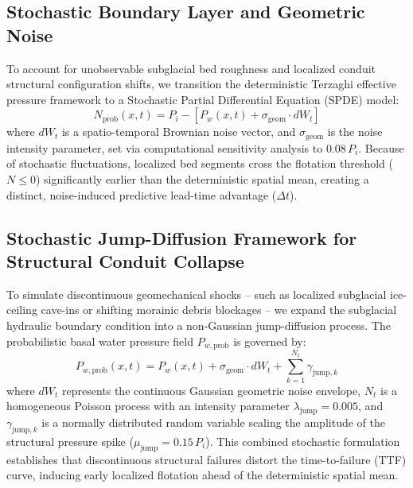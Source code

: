 \documentclass[11pt,twocolumn]{article}
\begin{document}
\subsection{Stochastic Boundary Layer and Geometric Noise}
To account for unobservable subglacial bed roughness and localized conduit structural configuration shifts, we transition the deterministic Terzaghi effective pressure framework to a Stochastic Partial Differential Equation (SPDE) model:
\begin{equation}
N_{\text{prob}}(x, t) = P_i - \left[ P_w(x, t) + \sigma_{\text{geom}} \cdot dW_t \right]
\end{equation}
where $dW_t$ is a spatio-temporal Brownian noise vector, and $\sigma_{\text{geom}}$ is the noise intensity parameter, set via computational sensitivity analysis to $0.08 \, P_i$. Because of stochastic fluctuations, localized bed segments cross the flotation threshold ($N \le 0$) significantly earlier than the deterministic spatial mean, creating a distinct, noise-induced predictive lead-time advantage ($\Delta t$).
\subsection{Stochastic Jump-Diffusion Framework for Structural Conduit Collapse}
To simulate discontinuous geomechanical shocks -- such as localized subglacial ice-ceiling cave-ins or shifting morainic debris blockages -- we expand the subglacial hydraulic boundary condition into a non-Gaussian jump-diffusion process. The probabilistic basal water pressure field $P_{w,\text{prob}}$ is governed by:
\begin{equation}
P_{w,\text{prob}}(x, t) = P_w(x, t) + \sigma_{\text{geom}} \cdot dW_t + \sum_{k=1}^{N_t} \gamma_{\text{jump}, k}
\end{equation}
where $dW_t$ represents the continuous Gaussian geometric noise envelope, $N_t$ is a homogeneous Poisson process with an intensity parameter $\lambda_{\text{jump}} = 0.005$, and $\gamma_{\text{jump}, k}$ is a normally distributed random variable scaling the amplitude of the structural pressure spike ($\mu_{\text{jump}} = 0.15 \, P_i$). This combined stochastic formulation establishes that discontinuous structural failures distort the time-to-failure (TTF) curve, inducing early localized flotation ahead of the deterministic spatial mean.
\end{document}
